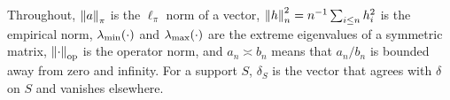 Throughout, $\left\lVert a \right\rVert_\pi$ is the $\ell_\pi$ norm of a vector,
$\left\lVert h \right\rVert_{n}^2 = n^{-1}\sum_{i\le n} h_i^2$ is the empirical norm,
$\lambda_{\min}(\cdot)$ and $\lambda_{\max}(\cdot)$ are the extreme eigenvalues of a symmetric
matrix, $\left\lVert \cdot \right\rVert_{\mathrm{op}}$ is the operator norm, and $a_n \asymp b_n$ means that
$a_n/b_n$ is bounded away from zero and infinity. For a support
$S$, $\delta_S$ is the vector that agrees with $\delta$ on $S$ and vanishes
elsewhere.

